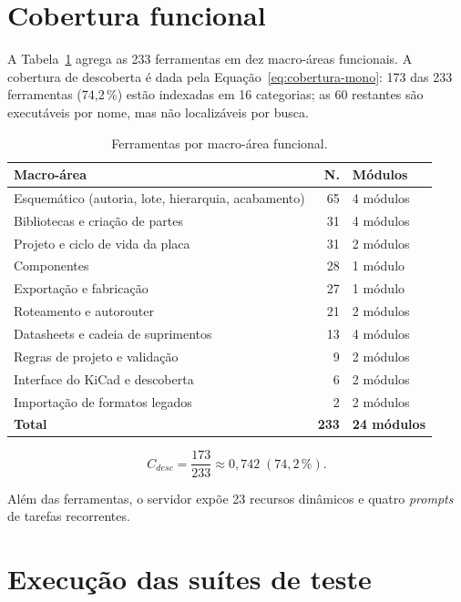 \section{Cobertura funcional}

A Tabela~\ref{tab:macro-mono} agrega as 233 ferramentas em dez macro-áreas
funcionais. A cobertura de descoberta é dada pela
Equação~\ref{eq:cobertura-mono}: 173 das 233 ferramentas (74,2\,\%) estão
indexadas em 16 categorias; as 60 restantes são executáveis por nome, mas não
localizáveis por busca.

\begin{table}[htbp]
\centering
\small
\caption{Ferramentas por macro-área funcional.}
\label{tab:macro-mono}
\begin{tabular}{@{}p{7.0cm}r p{6.0cm}@{}}
\toprule
\textbf{Macro-área} & \textbf{N.} & \textbf{Módulos} \\
\midrule
Esquemático (autoria, lote, hierarquia, acabamento) & 65 & 4 módulos \\
Bibliotecas e criação de partes & 31 & 4 módulos \\
Projeto e ciclo de vida da placa & 31 & 2 módulos \\
Componentes & 28 & 1 módulo \\
Exportação e fabricação & 27 & 1 módulo \\
Roteamento e autorouter & 21 & 2 módulos \\
Datasheets e cadeia de suprimentos & 13 & 4 módulos \\
Regras de projeto e validação & 9 & 2 módulos \\
Interface do KiCad e descoberta & 6 & 2 módulos \\
Importação de formatos legados & 2 & 2 módulos \\
\midrule
\textbf{Total} & \textbf{233} & \textbf{24 módulos} \\
\bottomrule
\end{tabular}
\end{table}

\begin{equation}
\label{eq:cobertura-mono}
C_{desc} = \frac{173}{233} \approx 0{,}742 \;(74{,}2\,\%).
\end{equation}

Além das ferramentas, o servidor expõe 23 recursos dinâmicos e quatro
\emph{prompts} de tarefas recorrentes.

\section{Execução das suítes de teste}


